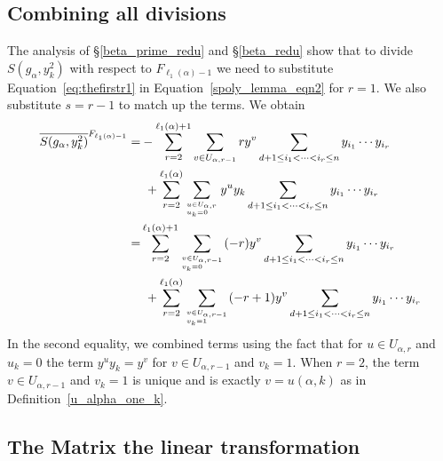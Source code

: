 \documentclass[12pt,reqno]{amsart}
\theoremstyle{plain}
\theoremstyle{definition}
\begin{document}
\subsection{\label{final_red}Combining all divisions}
The analysis of \S\ref{beta_prime_redu} and \S\ref{beta_redu} show that  to divide $S(g_\alpha, y_k^2)$ with respect to $F_{\ell_1(\alpha)-1}$  we need to substitute Equation~\eqref{eq:thefirstr1} in Equation~\eqref{spoly_lemma_eqn2} for $r=1$. We also substitute $s=r-1$ to match up the terms. We obtain
\begin{align}
	\overline{S(g_\alpha, y_k^2)}^{F_{\ell_1(\alpha)-1}} = &
	  - \sum_{r=2}^{\ell_1(\alpha)+1} \sum_{v \in U_{\alpha,r-1}} ry^v \sum_{d+1 \leq i_1 < \cdots < i_{r} \leq n}y_{i_1} \cdots  y_{i_{r}} \label{eq:sreduction}\\ 
	  &\  + \sum_{r=2}^{\ell_1(\alpha)}\sum_{u \in U_{\alpha,r}\atop u_k=0 \hfill} y^{u}y_k \sum_{d+1 \leq i_1 < \cdots < i_r \leq n} y_{i_1} \cdots y_{i_{r}}  
	   \notag\\
	   = &
	   \sum_{r=2}^{\ell_1(\alpha)+1} \sum_{v \in U_{\alpha,r-1}\atop v_k=0\hfill} (-r)y^v \sum_{d+1 \leq i_1 < \cdots < i_{r} \leq n}y_{i_1} \cdots  y_{i_{r}} \label{eq:sreduction2}\\ 
	  &\  + \sum_{r=2}^{\ell_1(\alpha)}\sum_{v \in U_{\alpha,r-1}\atop v_k=1 \hfill} (-r+1)y^{v} \sum_{d+1 \leq i_1 < \cdots < i_r \leq n} y_{i_1} \cdots y_{i_{r}}  
	   \notag
\end{align}
In the second equality, we combined terms using the fact that for $u \in U_{\alpha,r}$ and $u_k=0$ the term $y^uy_k=y^v$ for $v \in U_{\alpha,r-1}$ and $v_k=1$. When $r=2$, the term $v \in U_{\alpha,r-1}$ and $v_k=1$ is unique and is exactly $v=u(\alpha,k)$  as in Definition~\ref{u_alpha_one_k}.

\subsection{\label{results} The Matrix the linear transformation}
\end{document}
